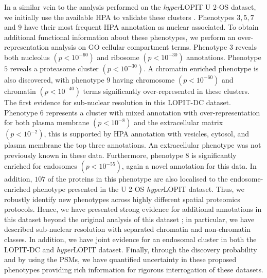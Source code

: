 \documentclass[12pt,english]{article}
\begin{document}
 In a similar vein to the analysis performed on the \textit{hyper}LOPIT U 2-OS dataset, we initially use the available HPA to validate these clusters \citep{Thul:2017}. Phenotypes $3,5,7$ and $9$ have their most frequent HPA annotation as nuclear associated. To obtain additional functional information about these phenotypes, we perform an over-representation analysis on GO cellular compartment terms. Phenotype $3$ reveals both nucleolus $(p < 10^{-60})$ and ribosome $(p < 10^{-30})$ annotations. Phenotype $5$ reveals a proteasome cluster $(p < 10^{-30})$. A chromatin enriched phenotype is also discovered, with phenotype $9$ having chromosome $(p < 10^{-60})$ and chromatin $(p < 10^{-40})$ terms significantly over-represented in these clusters. The first evidence for sub-nuclear resolution in this LOPIT-DC dataset. Phenotype $6$ represents a cluster with mixed annotation with over-representation for both plasma membrane $(p < 10^{-8})$ and the extracellular matrix $(p < 10^{-2})$, this is supported by HPA annotation with vesicles, cytosol, and plasma membrane the top three annotations. An extracellular phenotype was not previously known in these data. Furthermore, phenotype $8$ is significantly enriched for endosomes $(p < 10^{-55})$, again a novel annotation for this data. In addition, $107$ of the proteins in this phenotype are also localised to the endosome-enriched phenotype presented in the U 2-OS \textit{hyper}LOPIT dataset. Thus, we robustly identify new phenotypes across highly different spatial proteomics protocols. Hence, we have presented strong evidence for additional annotations in this dataset beyond the original analysis of this dataset \citep{DC:2018}; in particular, we have described sub-nuclear resolution with separated chromatin and non-chromatin classes. In addition, we have joint evidence for an endosomal cluster in both the LOPIT-DC and \textit{hyper}LOPIT dataset. Finally, through the discovery probability and by using the PSMs, we have quantified uncertainty in these proposed phenotypes providing rich information for rigorous interrogation of these datasets.
 
\end{document}
